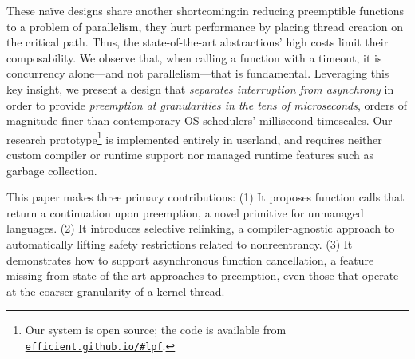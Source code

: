 These na\"ive designs share another shortcoming:\@ in reducing
preemptible functions to a problem of parallelism, they hurt performance by placing
thread creation on the critical path.  Thus, the state-of-the-art abstractions' high
costs limit their composability.  We observe that, when calling a function with
a timeout, it is concurrency alone---and not parallelism---that is fundamental.
Leveraging this key insight, we present a design that \textit{separates interruption
from asynchrony} in order to provide \textit{preemption at granularities in the tens
of microseconds}, orders of magnitude finer than contemporary OS schedulers'
millisecond timescales.  Our research prototype\footnote{Our system is open source;
the code is available from
\href{https://efficient.github.io/\#lpf}{\texttt{efficient.github.io/\#lpf}}.} is
implemented entirely in userland, and
requires neither custom compiler or runtime support nor managed runtime features such
as garbage collection.

This paper makes three primary contributions:  (1) It proposes function calls that
return a continuation upon preemption, a novel primitive for unmanaged languages.
(2) It introduces selective relinking, a compiler-agnostic approach to automatically
lifting safety restrictions related to nonreentrancy.  (3) It demonstrates how to
support asynchronous function cancellation, a feature missing from state-of-the-art
approaches to preemption, even those that operate at the coarser granularity of a
kernel thread.
